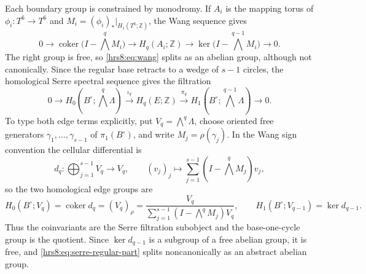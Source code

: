 Each boundary group is constrained by monodromy.  If $A_i$ is the mapping
torus of $\phi_i\colon T^6\to T^6$ and
$M_i=(\phi_i)_*|_{H_1(T^6;\mathbb Z)}$, the Wang sequence gives
\begin{equation}
 0\longrightarrow
 \operatorname{coker}\bigl(I-\textstyle\bigwedge^qM_i\bigr)
 \longrightarrow H_q(A_i;\mathbb Z)
 \longrightarrow
 \ker\bigl(I-\textstyle\bigwedge^{q-1}M_i\bigr)
 \longrightarrow0.
 \label{hrs8:eq:wang}
\end{equation}
The right group is free, so \eqref{hrs8:eq:wang} splits as an abelian group,
although not canonically.  Since the regular base retracts to a wedge of
$s-1$ circles, the homological Serre spectral sequence gives the filtration
\begin{equation}
 0\longrightarrow
 H_0\!\left(B^\circ;\textstyle\bigwedge^q\Lambda\right)
 \xrightarrow{\ \iota_q\ } H_q(E;\mathbb Z)
 \xrightarrow{\ \pi_q\ }
 H_1\!\left(B^\circ;\textstyle\bigwedge^{q-1}\Lambda\right)
 \longrightarrow0.
 \label{hrs8:eq:serre-regular-part}
\end{equation}
To type both edge terms explicitly, put
\(V_q=\bigwedge^q\Lambda\), choose oriented free generators
\(\gamma_1,\ldots,\gamma_{s-1}\) of \(\pi_1(B^\circ)\), and write
\(M_j=\rho(\gamma_j)\).  In the Wang sign convention the cellular differential is
\begin{equation}
 d_q\colon\bigoplus_{j=1}^{s-1}V_q\longrightarrow V_q,\qquad
 (v_j)_j\longmapsto
 \sum_{j=1}^{s-1}\left(I-\textstyle\bigwedge^qM_j\right)v_j,
 \label{hrs8:eq:serre-cellular-differential}
\end{equation}
so the two homological edge groups are
\begin{equation}
 H_0(B^\circ;V_q)
 =\operatorname{coker}d_q
 =(V_q)_\rho
 =\frac{V_q}{
   \sum_{j=1}^{s-1}(I-\bigwedge^qM_j)V_q},
 \qquad
 H_1(B^\circ;V_{q-1})=\ker d_{q-1}.
 \label{hrs8:eq:serre-coinvariants-kernel}
\end{equation}
Thus the coinvariants are the Serre filtration subobject and the
base-one-cycle group is the quotient.  Since \(\ker d_{q-1}\) is a subgroup
of a free abelian group, it is free, and
\eqref{hrs8:eq:serre-regular-part} splits noncanonically as an abstract
abelian group.

